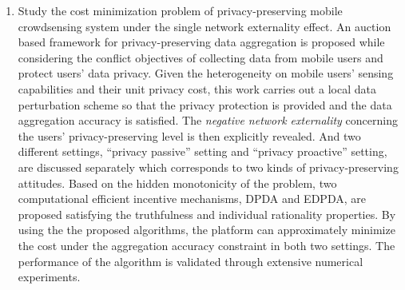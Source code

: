 \begin{englishabstract}
\begin{enumerate}
		
		\item Study the cost minimization problem of privacy-preserving mobile crowdsensing system under the single network externality effect. An auction based framework for privacy-preserving data aggregation is proposed while considering the conflict objectives of collecting data from mobile users and protect users' data privacy. Given the heterogeneity on mobile users' sensing capabilities and their unit privacy cost, this work carries out a local data perturbation scheme so that the privacy protection is provided and the data aggregation accuracy is satisfied. The \textsl{negative network externality} concerning the users' privacy-preserving level is then explicitly revealed. And two different settings, ``privacy passive'' setting and ``privacy proactive'' setting, are discussed separately which corresponds to two kinds of privacy-preserving attitudes. Based on the hidden monotonicity of the problem, two computational efficient incentive mechanisms, DPDA and EDPDA, are proposed satisfying the truthfulness and individual rationality properties. By using the the proposed algorithms, the platform can approximately minimize the cost under the aggregation accuracy constraint in both two settings. The performance of the algorithm is validated through extensive numerical experiments.
		

\end{enumerate}
\end{englishabstract}
